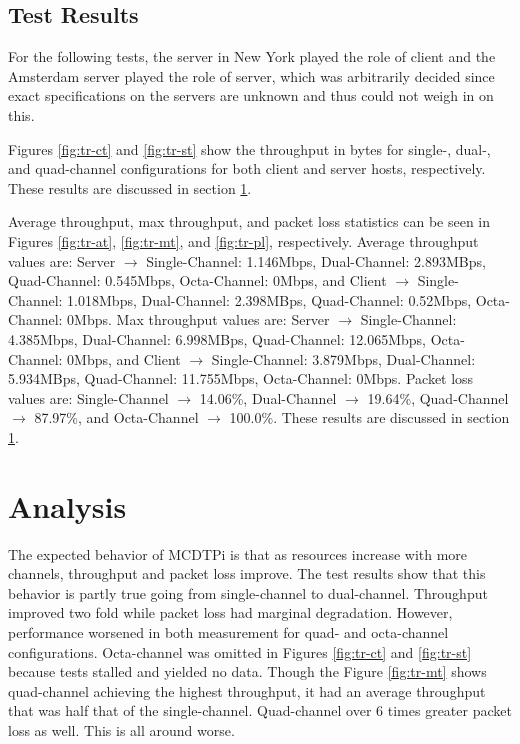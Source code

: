 \subsection{Test Results}

For the following tests, the server in New York played the role of client and the Amsterdam server played the role of server, which was arbitrarily decided since exact specifications on the servers are unknown and thus could not weigh in on this.

Figures \ref{fig:tr-ct} and \ref{fig:tr-st} show the throughput in bytes for single-, dual-, and quad-channel configurations for both client and server hosts, respectively. These results are discussed in section \ref{sec:anlys}.

Average throughput, max throughput, and packet loss statistics can be seen in Figures \ref{fig:tr-at}, \ref{fig:tr-mt}, and \ref{fig:tr-pl}, respectively. Average throughput values are: Server $\rightarrow$ Single-Channel: 1.146Mbps, Dual-Channel: 2.893MBps, Quad-Channel: 0.545Mbps, Octa-Channel: 0Mbps, and Client $\rightarrow$ Single-Channel: 1.018Mbps, Dual-Channel: 2.398MBps, Quad-Channel: 0.52Mbps, Octa-Channel: 0Mbps. Max throughput values are: Server $\rightarrow$ Single-Channel: 4.385Mbps, Dual-Channel: 6.998MBps, Quad-Channel: 12.065Mbps, Octa-Channel: 0Mbps, and Client $\rightarrow$ Single-Channel: 3.879Mbps, Dual-Channel: 5.934MBps, Quad-Channel: 11.755Mbps, Octa-Channel: 0Mbps. Packet loss values are: Single-Channel $\rightarrow$ 14.06\%, Dual-Channel $\rightarrow$ 19.64\%, Quad-Channel $\rightarrow$ 87.97\%, and Octa-Channel $\rightarrow$ 100.0\%. These results are discussed in section \ref{sec:anlys}.

\section{Analysis}\label{sec:anlys}

The expected behavior of MCDTPi is that as resources increase with more channels, throughput and packet loss improve. The test results show that this behavior is partly true going from single-channel to dual-channel. Throughput improved two fold while packet loss had marginal degradation. However, performance worsened in both measurement for quad- and octa-channel configurations. Octa-channel was omitted in Figures \ref{fig:tr-ct} and \ref{fig:tr-st} because tests stalled and yielded no data. Though the Figure \ref{fig:tr-mt} shows quad-channel achieving the highest throughput, it had an average throughput that was half that of the single-channel. Quad-channel over 6 times greater packet loss as well. This is all around worse.


